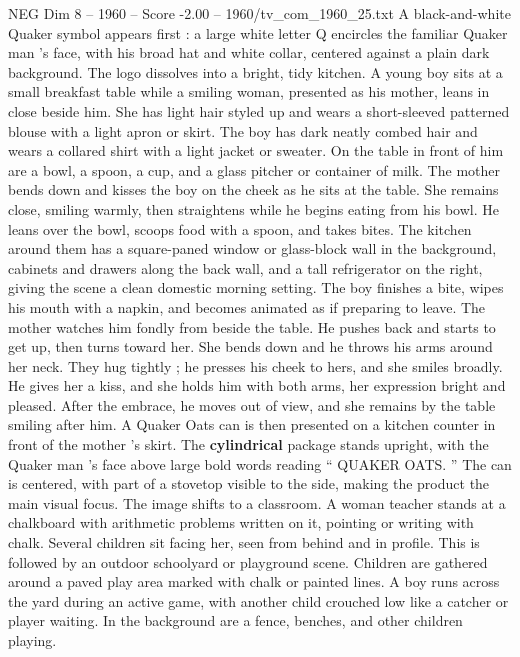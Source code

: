 \begin{textsample}{NEG Dim 8 – 1960 – Score -2.00 – 1960/tv\_com\_1960\_25.txt}  \label{ex:f8_neg_014}
A black-and-white Quaker symbol appears first : a large white letter Q encircles the familiar Quaker man ’s face, with his broad hat and white collar, centered against a plain dark background.
The logo dissolves into a bright, tidy kitchen.
A young boy sits at a small breakfast table while a smiling woman, presented as his mother, leans in close beside him.
She has light hair styled up and wears a short-sleeved patterned blouse with a light apron or skirt.
The boy has dark neatly combed hair and wears a collared shirt with a light jacket or sweater.
On the table in front of him are a bowl, a spoon, a cup, and a glass pitcher or container of milk.
The mother bends down and kisses the boy on the cheek as he sits at the table.
She remains close, smiling warmly, then straightens while he begins eating from his bowl.
He leans over the bowl, scoops food with a spoon, and takes bites.
The kitchen around them has a square-paned window or glass-block wall in the background, cabinets and drawers along the back wall, and a tall refrigerator on the right, giving the scene a clean domestic morning setting.
The boy finishes a bite, wipes his mouth with a napkin, and becomes animated as if preparing to leave.
The mother watches him fondly from beside the table.
He pushes back and starts to get up, then turns toward her.
She bends down and he throws his arms around her neck.
They hug tightly ; he presses his cheek to hers, and she smiles broadly.
He gives her a kiss, and she holds him with both arms, her expression bright and pleased.
After the embrace, he moves out of view, and she remains by the table smiling after him.
A Quaker Oats can is then presented on a kitchen counter in front of the mother ’s skirt.
The \textbf{cylindrical} package stands upright, with the Quaker man ’s face above large bold words reading “ QUAKER OATS. ” The can is centered, with part of a stovetop visible to the side, making the product the main visual focus.
The image shifts to a classroom.
A woman teacher stands at a chalkboard with arithmetic problems written on it, pointing or writing with chalk.
Several children sit facing her, seen from behind and in profile.
This is followed by an outdoor schoolyard or playground scene.
Children are gathered around a paved play area marked with chalk or painted lines.
A boy runs across the yard during an active game, with another child crouched low like a catcher or player waiting.
In the background are a fence, benches, and other children playing.

\end{textsample}
